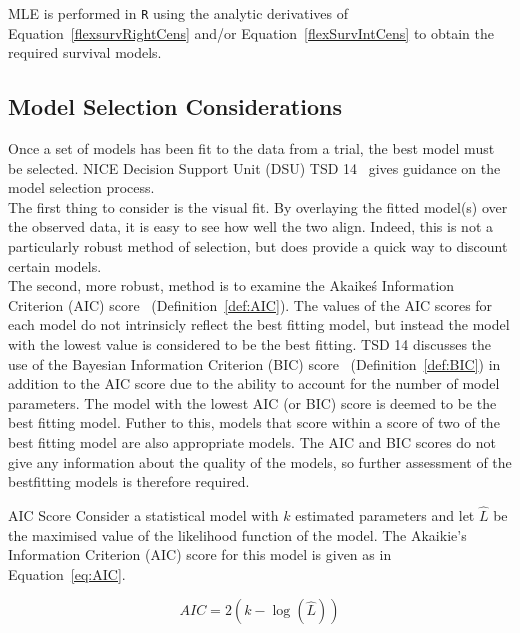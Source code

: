 MLE is performed in \verb|R| using the analytic derivatives of Equation~\ref{flexsurvRightCens} and/or Equation~\ref{flexSurvIntCens} to obtain the required survival models. 

\subsection{Model Selection Considerations}
Once a set of models has been fit to the data from a trial, the best model must be selected. NICE Decision Support Unit (DSU) TSD 14~\cite{tsd14} gives guidance on the model selection process. \\

The first thing to consider is the visual fit. By overlaying the fitted model(s) over the observed data, it is easy to see how well the two align. Indeed, this is not a particularly robust method of selection, but does provide a quick way to discount certain models. \\

The second, more robust, method is to examine the Akaike\'s Information Criterion (AIC) score~\cite{akaike} (Definition~\ref{def:AIC}). The values of the AIC scores for each model do not intrinsicly reflect the best fitting model, but instead the model with the lowest value is considered to be the best fitting. TSD 14 discusses the use of the Bayesian Information Criterion (BIC) score~\cite{schwarz} (Definition~\ref{def:BIC}) in addition to the AIC score due to the ability to account for the number of model parameters. The model with the lowest AIC (or BIC) score is deemed to be the best fitting model. Futher to this, models that score within a score of two of the best fitting model are also appropriate models. The AIC and BIC scores do not give any information about the quality of the models, so further assessment of the best\-fitting models is therefore required.

\begin{definition}[label=def:AIC]{AIC Score}
    Consider a statistical model with $k$ estimated parameters and let $\hat{L}$ be the maximised value of the likelihood function of the model. The Akaikie's Information Criterion (AIC) score for this model is given as in Equation~\ref{eq:AIC}.

    \begin{equation}
        AIC = 2(k - \log(\hat{L}))
        \label{eq:AIC}
    \end{equation}
\end{definition}


